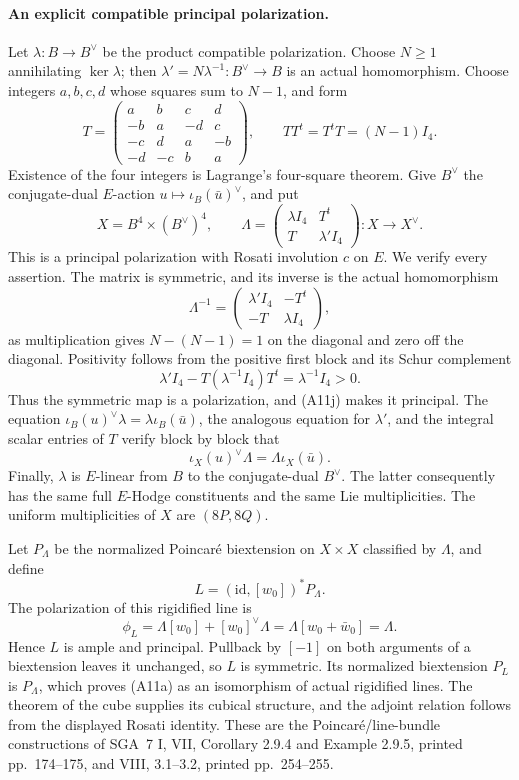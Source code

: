 \documentclass[11pt]{article}
\theoremstyle{definition}\newtheorem{definition}[theorem]{Definition}\newtheorem{remark}[theorem]{Remark}
\begin{document}
\paragraph{An explicit compatible principal polarization.}
Let $\lambda:B\to B^\vee$ be the product compatible
polarization.  Choose $N\geq1$ annihilating $\ker\lambda$;
then $\lambda'=N\lambda^{-1}:B^\vee\to B$ is an actual
homomorphism.  Choose integers $a,b,c,d$ whose squares sum to
$N-1$, and form
\[
 T=\begin{pmatrix}
 a&b&c&d\\-b&a&-d&c\\-c&d&a&-b\\-d&-c&b&a
 \end{pmatrix},\qquad
 TT^t=T^tT=(N-1)I_4.
\]
Existence of the four integers is Lagrange's four-square
theorem.  Give $B^\vee$ the conjugate-dual $E$-action
$u\mapsto\iota_B(\bar u)^\vee$, and put
\[
 X=B^4\times(B^\vee)^4,\qquad
 \Lambda=
 \begin{pmatrix}\lambda I_4&T^t\\T&\lambda'I_4\end{pmatrix}
       :X\longrightarrow X^\vee.
 \tag{A11i}
\]
This is a principal polarization with Rosati involution $c$
on $E$.  We verify every assertion.  The matrix is symmetric,
and its inverse is the actual homomorphism
\[
 \Lambda^{-1}=
 \begin{pmatrix}\lambda'I_4&-T^t\\-T&\lambda I_4\end{pmatrix},
 \tag{A11j}
\]
as multiplication gives $N-(N-1)=1$ on the diagonal and zero
off the diagonal.  Positivity follows from the positive first
block and its Schur complement
\[
       \lambda'I_4-T(\lambda^{-1}I_4)T^t
                         =\lambda^{-1}I_4>0.
\]
Thus the symmetric map is a polarization, and (A11j) makes it
principal.  The equation
$\iota_B(u)^\vee\lambda=\lambda\iota_B(\bar u)$,
the analogous equation for $\lambda'$, and the integral scalar
entries of $T$ verify block by block that
\[
       \iota_X(u)^\vee\Lambda=\Lambda\iota_X(\bar u).
\]
Finally, $\lambda$ is $E$-linear from $B$ to the
conjugate-dual $B^\vee$.  The latter consequently has the same
full $E$-Hodge constituents and the same Lie multiplicities.
The uniform multiplicities of $X$ are $(8P,8Q)$.

Let $P_\Lambda$ be the normalized Poincar\'e biextension on
$X\times X$ classified by $\Lambda$, and define
\[
                 L=(\mathrm{id},[w_0])^*P_\Lambda.
 \tag{A11k}
\]
The polarization of this rigidified line is
\[
  \phi_L=\Lambda[w_0]+[w_0]^\vee\Lambda
          =\Lambda[w_0+\bar w_0]=\Lambda.
\]
Hence $L$ is ample and principal.  Pullback by $[-1]$ on both
arguments of a biextension leaves it unchanged, so $L$ is
symmetric.  Its normalized biextension $P_L$ is $P_\Lambda$,
which proves (A11a) as an isomorphism of actual rigidified
lines.  The theorem of the cube supplies its cubical structure,
and the adjoint relation follows from the displayed Rosati
identity.  These are the Poincar\'e/line-bundle constructions of
SGA~7 I, VII, Corollary 2.9.4 and Example 2.9.5, printed
pp.~174--175, and VIII, 3.1--3.2, printed pp.~254--255.
\end{document}
